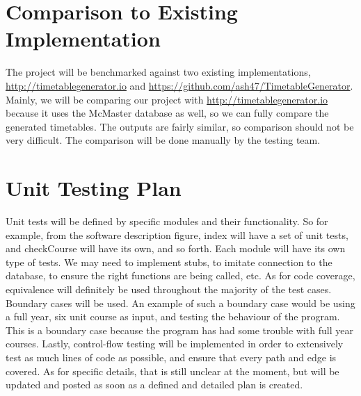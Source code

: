 \documentclass[11pt, oneside]{article}   	%
\begin{document}
\section{Comparison to Existing Implementation}\label{sec:compare}
The project will be benchmarked against two existing implementations, \url{http://timetablegenerator.io} and \url{https://github.com/ash47/TimetableGenerator}. Mainly, we will be comparing our project with \url{http://timetablegenerator.io} because it uses the McMaster database as well, so we can fully compare the generated timetables. The outputs are fairly similar, so comparison should not be very difficult. The comparison will be done manually by the testing team.
\section{Unit Testing Plan}
Unit tests will be defined by specific modules and their functionality. So for example, from the software description figure, index will have a set of unit tests, and checkCourse will have its own, and so forth. Each module will have its own type of tests. We may need to implement stubs, to imitate connection to the database, to ensure the right functions are being called, etc. As for code coverage, equivalence will definitely be used throughout the majority of the test cases. Boundary cases will be used. An example of such a boundary case would be using a full year, six unit course as input, and testing the behaviour of the program. This is a boundary case because the program has had some trouble with full year courses. Lastly, control-flow testing will be implemented in order to extensively test as much lines of code as possible, and ensure that every path and edge is covered. As for specific details, that is still unclear at the moment, but will be updated and posted as soon as a defined  and detailed plan is created.
\end{document}
